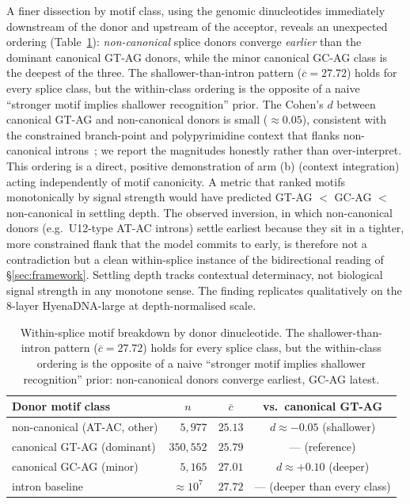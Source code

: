 \documentclass{article}
\theoremstyle{plain}
\theoremstyle{definition}
\theoremstyle{remark}
\begin{document}
A finer dissection by motif class, using the genomic dinucleotides immediately downstream of the donor and upstream of the acceptor, reveals an unexpected ordering (Table~\ref{tab:splice-canonical}): \emph{non-canonical} splice donors converge \emph{earlier} than the dominant canonical GT-AG donors, while the minor canonical GC-AG class is the deepest of the three. The shallower-than-intron pattern
($\overline{c}\!=\!27.72$) holds for every splice class, but the within-class
ordering is the opposite of a naive ``stronger motif implies
shallower recognition'' prior. The Cohen's $d$ between canonical GT-AG
and non-canonical donors is small ($\approx 0.05$), consistent with the
constrained branch-point and polypyrimidine context that flanks
non-canonical introns~\cite{wang2008splicecode,burge1998u12}; we
report the magnitudes honestly rather than over-interpret.
This ordering is a direct, positive
demonstration of arm (b) (context integration) acting independently of
motif canonicity. A metric that ranked motifs monotonically by signal strength would have predicted GT-AG $<$ GC-AG $<$ non-canonical in settling depth. The observed inversion, in which non-canonical donors (e.g.\ U12-type AT-AC introns) settle earliest because they sit in a tighter, more constrained flank that the model commits to early, is therefore not a contradiction but a clean within-splice instance of the bidirectional reading of \S\ref{sec:framework}. Settling depth tracks
contextual determinacy, not biological signal strength in any monotone
sense. The finding replicates qualitatively on the 8-layer HyenaDNA-large
at depth-normalised scale.

\begin{table}[!htbp]
  \caption{Within-splice motif breakdown by donor dinucleotide. The
    shallower-than-intron pattern ($\overline{c}\!=\!27.72$) holds for every
    splice class, but the within-class ordering is the opposite of a naive
    ``stronger motif implies shallower recognition'' prior:
  non-canonical donors converge earliest, GC-AG latest.}
  \label{tab:splice-canonical}
  \centering
  \small
  \begin{tabular}{@{}lccc@{}}
    \toprule
    Donor motif class & $n$ & $\overline{c}$ & vs.\ canonical GT-AG \\
    \midrule
    non-canonical (AT-AC, other) & $\phantom{00}5{,}977$ & $25.13$ & $d\approx -0.05$ (shallower) \\
    canonical GT-AG (dominant)   & $350{,}552$ & $25.79$ & --- (reference) \\
    canonical GC-AG (minor)      & $\phantom{00}5{,}165$ & $27.01$ & $d\approx +0.10$ (deeper) \\
    \midrule
    intron baseline              & $\approx\!10^{7}$\phantom{0} & $27.72$ & --- (deeper than every class) \\
    \bottomrule
  \end{tabular}
\end{table}
\end{document}

